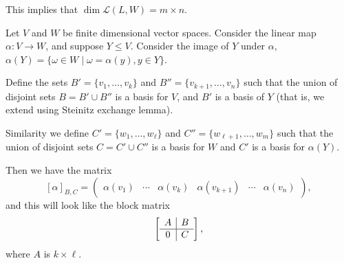 \documentclass[a4paper]{scrartcl}
\begin{document}
\begin{remark}
    This implies that $\dim \mathcal{L}(L, W) = m \times n$.
\end{remark}

\begin{example}
    Let $V$ and $W$ be finite dimensional vector spaces.
    Consider the linear map $\alpha: V \rightarrow W$, and suppose $Y \leq V$. Consider the image of $Y$ under $\alpha$, $\alpha(Y) = \{ \omega \in W \mid \omega = \alpha(y), y \in Y\}$.

    Define the sets $B' = \{v_1, \dots, v_k\}$ and $B'' = \{v_{k + 1}, \dots, v_n\}$ such that the union of disjoint sets $B = B' \cup B''$ is a basis for $V$, and $B'$ is a basis of $Y$ (that is, we extend using Steinitz exchange lemma).
    
    Similarity we define $C' = \{w_1, \dots, w_\ell\}$ and $C'' = \{w_{\ell + 1}, \dots, w_m\}$ such that the union of disjoint sets $C = C' \cup C''$ is a basis for $W$ and $C'$ is a basis for $\alpha(Y)$.

    Then we have the matrix
    $$ 
    [\alpha]_{B, C} = \begin{pmatrix}
        \alpha(v_1) & \cdots & \alpha(v_k) & \alpha(v_{k + 1}) & \cdots & \alpha(v_n)
    \end{pmatrix},
    $$
    and this will look like the block matrix
    $$
    \left[\begin{array}{ c | c }
        A & B \\
        \hline
        0 & C
      \end{array}\right],
    $$
    where $A$ is $k \times \ell$.
\end{example}
\end{document}
